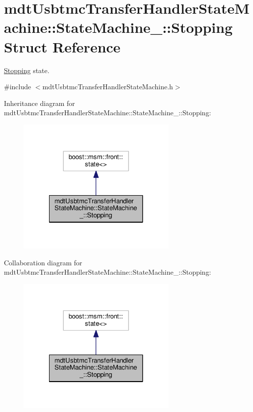 \hypertarget{structmdt_usbtmc_transfer_handler_state_machine_1_1_state_machine___1_1_stopping}{\section{mdt\-Usbtmc\-Transfer\-Handler\-State\-Machine\-:\-:State\-Machine\-\_\-\-:\-:Stopping Struct Reference}
\label{structmdt_usbtmc_transfer_handler_state_machine_1_1_state_machine___1_1_stopping}
}


\hyperlink{structmdt_usbtmc_transfer_handler_state_machine_1_1_state_machine___1_1_stopping}{Stopping} state.  




{\ttfamily \#include $<$mdt\-Usbtmc\-Transfer\-Handler\-State\-Machine.\-h$>$}



Inheritance diagram for mdt\-Usbtmc\-Transfer\-Handler\-State\-Machine\-:\-:State\-Machine\-\_\-\-:\-:Stopping\-:\nopagebreak
\begin{figure}[H]
\begin{center}
\leavevmode
\includegraphics[width=222pt]{structmdt_usbtmc_transfer_handler_state_machine_1_1_state_machine___1_1_stopping__inherit__graph}
\end{center}
\end{figure}


Collaboration diagram for mdt\-Usbtmc\-Transfer\-Handler\-State\-Machine\-:\-:State\-Machine\-\_\-\-:\-:Stopping\-:\nopagebreak
\begin{figure}[H]
\begin{center}
\leavevmode
\includegraphics[width=222pt]{structmdt_usbtmc_transfer_handler_state_machine_1_1_state_machine___1_1_stopping__coll__graph}
\end{center}
\end{figure}
